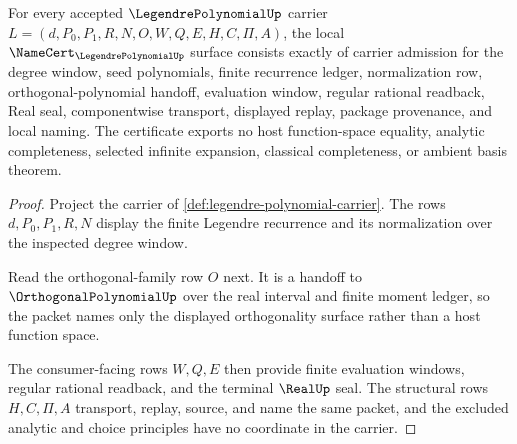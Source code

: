 \begin{theorem}
\label{thm:legendre-polynomial-namecert-obligations}
For every accepted $\LegendrePolynomialUp$ carrier $L=(d,P_0,P_1,R,N,O,W,Q,E,H,C,\Pi,A)$, the local $\NameCert_{\LegendrePolynomialUp}$ surface consists exactly of carrier admission for the degree window, seed polynomials, finite recurrence ledger, normalization row, orthogonal-polynomial handoff, evaluation window, regular rational readback, Real seal, componentwise transport, displayed replay, package provenance, and local naming. The certificate exports no host function-space equality, analytic completeness, selected infinite expansion, classical completeness, or ambient basis theorem.
\end{theorem}
\begin{proof}
Project the carrier of \autoref{def:legendre-polynomial-carrier}. The rows $d,P_0,P_1,R,N$ display the finite Legendre recurrence and its normalization over the inspected degree window.

Read the orthogonal-family row $O$ next. It is a handoff to $\OrthogonalPolynomialUp$ over the real interval and finite moment ledger, so the packet names only the displayed orthogonality surface rather than a host function space.

The consumer-facing rows $W,Q,E$ then provide finite evaluation windows, regular rational readback, and the terminal $\RealUp$ seal. The structural rows $H,C,\Pi,A$ transport, replay, source, and name the same packet, and the excluded analytic and choice principles have no coordinate in the carrier.
\end{proof}

